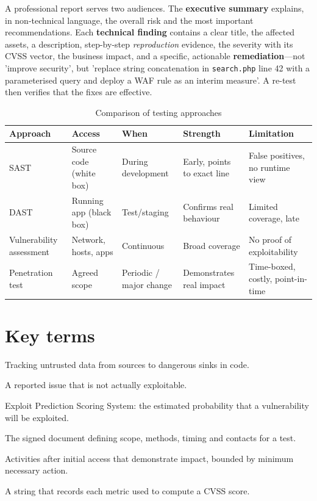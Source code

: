 A professional report serves two audiences. The \textbf{executive summary} explains, in non-technical language, the overall risk and the most important recommendations. Each \textbf{technical finding} contains a clear title, the affected assets, a description, step-by-step \emph{reproduction} evidence, the severity with its CVSS vector, the business impact, and a specific, actionable \textbf{remediation}—not 'improve security', but 'replace string concatenation in \texttt{search.php} line 42 with a parameterised query and deploy a WAF rule as an interim measure'. A re-test then verifies that the fixes are effective.

\begin{table}[htbp]
  \centering\small
  \caption{Comparison of testing approaches}
  \begin{tabularx}{\linewidth}{>{\raggedright\arraybackslash}X >{\raggedright\arraybackslash}X >{\raggedright\arraybackslash}X >{\raggedright\arraybackslash}X >{\raggedright\arraybackslash}X}
    \toprule
    \textbf{Approach} & \textbf{Access} & \textbf{When} & \textbf{Strength} & \textbf{Limitation} \\
    \midrule
    SAST & Source code (white box) & During development & Early, points to exact line & False positives, no runtime view \\
    DAST & Running app (black box) & Test/staging & Confirms real behaviour & Limited coverage, late \\
    Vulnerability assessment & Network, hosts, apps & Continuous & Broad coverage & No proof of exploitability \\
    Penetration test & Agreed scope & Periodic / major change & Demonstrates real impact & Time-boxed, costly, point-in-time \\
    \bottomrule
  \end{tabularx}
\end{table}
\section*{Key terms}
\begin{description}[style=nextline,leftmargin=1.2em]
  \item[Taint analysis] Tracking untrusted data from sources to dangerous sinks in code.
  \item[False positive] A reported issue that is not actually exploitable.
  \item[EPSS] Exploit Prediction Scoring System: the estimated probability that a vulnerability will be exploited.
  \item[Rules of engagement] The signed document defining scope, methods, timing and contacts for a test.
  \item[Post-exploitation] Activities after initial access that demonstrate impact, bounded by minimum necessary action.
  \item[CVSS vector] A string that records each metric used to compute a CVSS score.
\end{description}

